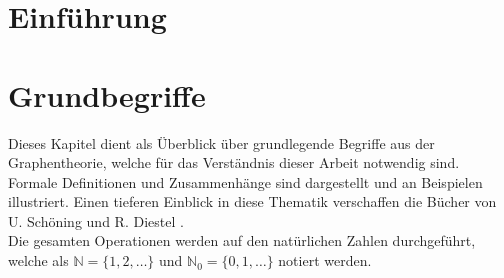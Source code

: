 




\chapter{Einführung}



\chapter{Grundbegriffe}
Dieses Kapitel dient als Überblick über grundlegende Begriffe aus der Graphentheorie, welche für das Verständnis dieser Arbeit notwendig sind. Formale Definitionen und Zusammenhänge sind dargestellt und an Beispielen illustriert. Einen tieferen Einblick in diese Thematik verschaffen die Bücher von U. Schöning \cite{Schoning} und R. Diestel \cite{Diestel}.\\
Die gesamten Operationen werden auf den natürlichen Zahlen durchgeführt, welche als $\mathbb{N}=\{1,2,\ldots\}$ und $\mathbb{N}_0=\{0,1,\ldots\}$ notiert werden.
